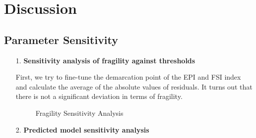 \section{Discussion}


\subsection{Parameter Sensitivity}

\begin{itemize}
   \item[1.] \textbf{Sensitivity analysis of fragility against thresholds}

First, we try to fine-tune the demarcation point of the EPI and FSI index and calculate the average of the absolute values of residuals. It turns out that there is not a significant deviation in terms of fragility.
\begin{figure}[htbp]
    \centering
    \caption{Fragility Sensitivity Analysis}
    \label{fig:exp:future}
\end{figure}
   \item[2.] \textbf{Predicted model sensitivity analysis}


\end{itemize}
